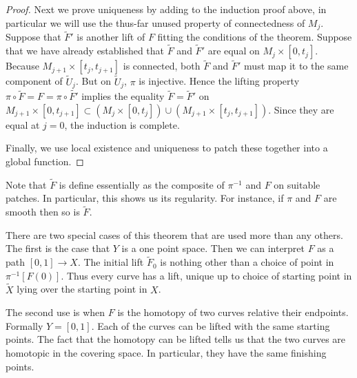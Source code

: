 \begin{proof}
Next we prove uniqueness by adding to the induction proof above, in particular we will use the thus-far unused property of connectedness of $M_j$.
Suppose that $\tilde{F}'$ is another lift of $F$ fitting the conditions of the theorem.
Suppose that we have already established that $\tilde{F}$ and $\tilde{F}'$ are equal on $M_j \times [0,t_j]$.
Because $M_{j+1} \times [t_j, t_{j+1}]$ is connected, both $\tilde{F}$ and $\tilde{F}'$ must map it to the same component of $\tilde{U}_j$.
But on $\tilde{U}_j$, $\pi$ is injective.
Hence the lifting property $\pi \circ \tilde{F} = F = \pi \circ \tilde{F'}$ implies the equality $\tilde{F} = \tilde{F}'$ on $M_{j+1} \times [0,t_{j+1}] \subset (M_{j} \times [0,t_{j}]) \cup (M_{j+1} \times [t_j,t_{j+1}])$.
Since they are equal at $j=0$, the induction is complete.

Finally, we use local existence and uniqueness to patch these together into a global function.
\end{proof}

Note that $\tilde{F}$ is define essentially as the composite of $\pi^{-1}$ and $F$ on suitable patches.
In particular, this shows us its regularity.
For instance, if $\pi$ and $F$ are smooth then so is $\tilde{F}$.

There are two special cases of this theorem that are used more than any others.
The first is the case that $Y$ is a one point space.
Then we can interpret $F$ as a path $[0,1] \to X$.
The initial lift $\tilde{F}_0$ is nothing other than a choice of point in $\pi^{-1}[F(0)]$.
Thus every curve has a lift, unique up to choice of starting point in $\tilde{X}$ lying over the starting point in $X$.

The second use is when $F$ is the homotopy of two curves relative their endpoints.
Formally $Y = [0,1]$.
Each of the curves can be lifted with the same starting points.
The fact that the homotopy can be lifted tells us that the two curves are homotopic in the covering space.
In particular, they have the same finishing points. 

